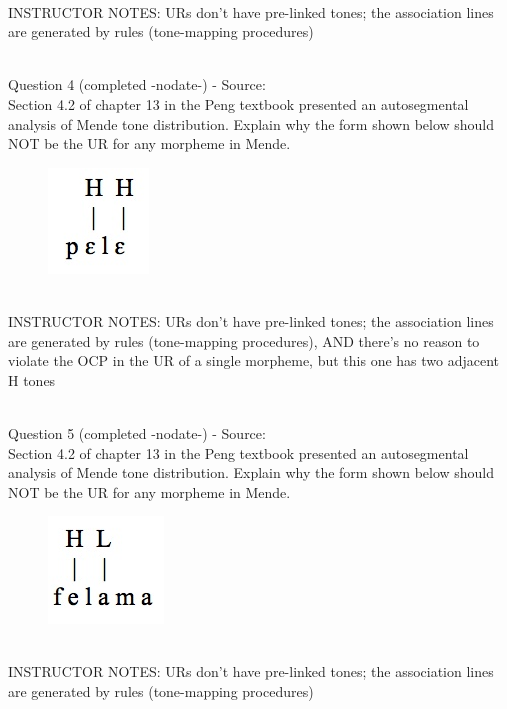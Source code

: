 \documentclass[12pt]{article}
\begin{document}
~\\
INSTRUCTOR NOTES: URs don't have pre-linked tones; the association lines are generated by rules (tone-mapping procedures)


~\\

{\large Question 4} (completed -nodate-) - Source: \\

Section 4.2 of chapter 13 in the Peng textbook presented an autosegmental analysis of Mende tone distribution. Explain why the form shown below should NOT be the UR for any morpheme in Mende.\\

\begin{figure}[H]
\includegraphics{../images/mende_house_e.png}
\end{figure}

~\\
INSTRUCTOR NOTES: URs don't have pre-linked tones; the association lines are generated by rules (tone-mapping procedures), AND there's no reason to violate the OCP in the UR of a single morpheme, but this one has two adjacent H tones


~\\

{\large Question 5} (completed -nodate-) - Source: \\

Section 4.2 of chapter 13 in the Peng textbook presented an autosegmental analysis of Mende tone distribution. Explain why the form shown below should NOT be the UR for any morpheme in Mende.\\

\begin{figure}[H]
\includegraphics{../images/mende_junction_a.png}
\end{figure}

~\\
INSTRUCTOR NOTES: URs don't have pre-linked tones; the association lines are generated by rules (tone-mapping procedures)
\end{document}
